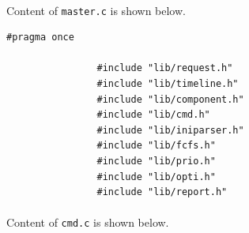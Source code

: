 \documentclass{article}
\begin{document}
            \paragraph{}
                Content of \texttt{master.c} is shown below.
            \begin{Verbatim}[gobble=8]
                #pragma once

                #include "lib/request.h"
                #include "lib/timeline.h"
                #include "lib/component.h"
                #include "lib/cmd.h"
                #include "lib/iniparser.h"
                #include "lib/fcfs.h"
                #include "lib/prio.h"
                #include "lib/opti.h"
                #include "lib/report.h"
            \end{Verbatim}
            \paragraph{}
                Content of \texttt{cmd.c} is shown below.
\end{document}
